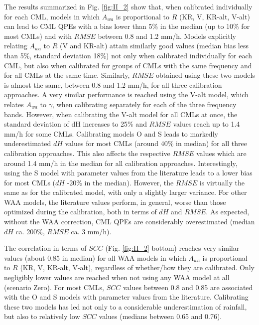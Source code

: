 \documentclass{ctuthesis}\usepackage[]{graphicx}\usepackage[]{color}
\begin{document}
The results summarized in Fig. \ref{fig:II_2} show that, when calibrated individually for each CML, models in which $A_{wa}$ is proportional to $R$ (KR, V, KR-alt, V-alt) can lead to CML QPEs with a bias lower than 5\% in the median (up to 10\% for most CMLs) and with $RMSE$ between 0.8 and 1.2 mm/h. Models explicitly relating $A_{wa}$ to $R$ (V and KR-alt) attain similarly good values (median bias less than 5\%, standard deviation 18\%) not only when calibrated individually for each CML, but also when calibrated for groups of CMLs with the same frequency and for all CMLs at the same time. Similarly, $RMSE$ obtained using these two models is almost the same, between 0.8 and 1.2 mm/h, for all three calibration approaches. A very similar performance is reached using the V-alt model, which relates $A_{wa}$ to $\gamma$, when calibrating separately for each of the three frequency bands. However, when calibrating the V-alt model for all CMLs at once, the standard deviation of dH increases to 25\% and $RMSE$ values reach up to 1.4 mm/h for some CMLs. Calibrating models O and S leads to markedly underestimated $dH$ values for most CMLs (around 40\% in median) for all three calibration approaches. This also affects the respective $RMSE$ values which are around 1.4 mm/h in the median for all calibration approaches. Interestingly, using the S model with parameter values from the literature leads to a lower bias for most CMLs ($dH$ -20\% in the median). However, the $RMSE$ is virtually the same as for the calibrated model, with only a slightly larger variance. For other WAA models, the literature values perform, in general, worse than those optimized during the calibration, both in terms of $dH$ and $RMSE$. As expected, without the WAA correction, CML QPEs are considerably overestimated (median $dH$ ca. 200\%, $RMSE$ ca. 3 mm/h). 



The correlation in terms of $SCC$ (Fig. \ref{fig:II_2} bottom) reaches very similar values (about 0.85 in median) for all WAA models in which $A_{wa}$ is proportional to $R$ (KR, V, KR-alt, V-alt), regardless of whether/how they are calibrated. Only negligibly lower values are reached when not using any WAA model at all (scenario Zero). For most CMLs, $SCC$ values between 0.8 and 0.85 are associated with the O and S models with parameter values from the literature. Calibrating these two models has led not only to a considerable underestimation of rainfall, but also to relatively low $SCC$ values (medians between 0.65 and 0.76). 
\end{document}
